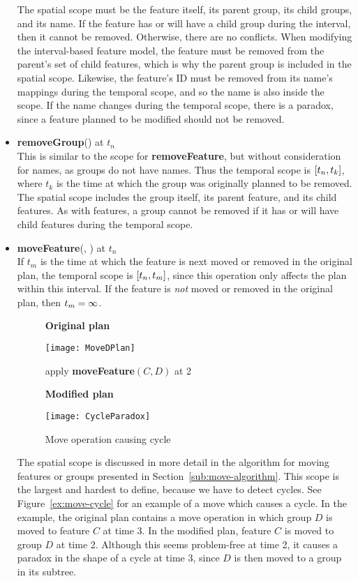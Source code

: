 \begin{itemize}
    The spatial scope must be the feature itself, its parent group, its child groups, and its name. If the feature has or will have a child group during the interval, then it cannot be removed. Otherwise, there are no conflicts. When modifying the interval-based feature model, the feature must be removed from the parent's set of child features, which is why the parent group is included in the spatial scope. Likewise, the feature's ID must be removed from its name's mappings during the temporal scope, and so the name is also inside the scope. If the name changes during the temporal scope, there is a paradox, since a feature planned to be modified should not be removed.  
  \item \textbf{removeGroup}() at $t_n$\\
    This is similar to the scope for \textbf{removeFeature}, but without consideration for names, as groups do not have names.  Thus the temporal scope is $\interval{t_n}{t_k}$, where $t_k$ is the time at which the group was originally planned to be removed. The spatial scope includes the group itself, its parent feature, and its child features. As with features, a group cannot be removed if it has or will have child features during the temporal scope.
  \item \textbf{moveFeature}(, ) at $t_n$ \\
    If $t_m$ is the time at which the feature is next moved or removed in the original plan, the temporal scope is $\interval{t_n}{t_m}$, since this operation only affects the plan within this interval. If the feature is \emph{not} moved or removed in the original plan, then $t_m = \infty$.
  \begin{figure}[h]
    \centering

      \textbf{Original plan}

      \texttt{[image: MoveDPlan]}
      \bigskip

      apply \textbf{moveFeature}$(C, D)$ at 2
      \bigskip

      \textbf{Modified plan}

      \texttt{[image: CycleParadox]}
    \caption{Move operation causing cycle}
    \label{ex:move-cycle}
  \end{figure}

  The spatial scope is discussed in more detail in the algorithm for moving features or groups presented in Section~\vref{sub:move-algorithm}. This scope is the largest and hardest to define, because we have to detect cycles. See Figure~\vref{ex:move-cycle} for an example of a move which causes a cycle. In the example, the original plan contains a move operation in which group $D$ is moved to feature $C$ at time 3. In the modified plan, feature $C$ is moved to group $D$ at time 2. Although this seems problem-free at time 2, it causes a paradox in the shape of a cycle at time 3, since $D$ is then moved to a group in its subtree. 


\end{itemize}
